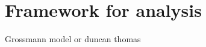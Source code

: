 \section{\noindent \label{sec:Framework}Framework for analysis}

Grossmann model or duncan thomas
  
  
  